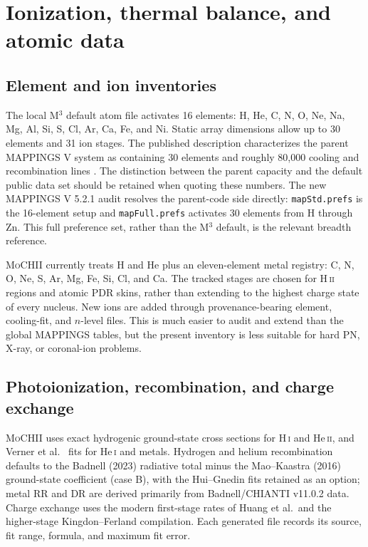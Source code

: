 \documentclass[english,a4paper]{my_memo}
\newcommand{\code}[1]{\texttt{#1}}
\newcommand{\MoCHII}{\textsc{MoCHII}}
\newcommand{\Mthree}{M$^3$}
\newcommand{\Mappings}{MAPPINGS V 5.2.1}
\newcommand{\HI}{H\,\textsc{i}}
\newcommand{\HeI}{He\,\textsc{i}}
\newcommand{\HeII}{He\,\textsc{ii}}
\begin{document}
\section{Ionization, thermal balance, and atomic data}

\subsection{Element and ion inventories}

The local \Mthree{} default atom file activates 16 elements:
H, He, C, N, O, Ne, Na, Mg, Al, Si, S, Cl, Ar, Ca, Fe, and Ni.  Static
array dimensions allow up to 30 elements and 31 ion stages.  The published
description characterizes the parent MAPPINGS V system as containing 30
elements and roughly 80,000 cooling and recombination lines
\cite{jin2022}.  The distinction between the parent capacity and the
default public data set should be retained when quoting these numbers.
The new \Mappings{} audit resolves the parent-code side directly:
\code{mapStd.prefs} is the 16-element setup and \code{mapFull.prefs}
activates 30 elements from H through Zn.  This full preference set, rather
than the \Mthree{} default, is the relevant breadth reference.

\MoCHII{} currently treats H and He plus an eleven-element metal registry:
C, N, O, Ne, S, Ar, Mg, Fe, Si, Cl, and Ca.  The tracked stages are chosen
for H\,\textsc{ii} regions and atomic PDR skins, rather than extending to
the highest charge state of every nucleus.  New ions are added through
provenance-bearing element, cooling-fit, and $n$-level files.  This is much
easier to audit and extend than the global MAPPINGS tables, but the present
inventory is less suitable for hard PN, X-ray, or coronal-ion problems.

\subsection{Photoionization, recombination, and charge exchange}

\MoCHII{} uses exact hydrogenic ground-state cross sections for \HI{} and
\HeII{}, and Verner et al.\ \cite{verner1996} fits for \HeI{} and metals.
Hydrogen and helium recombination defaults to the Badnell (2023) radiative
total minus the Mao--Kaastra (2016) ground-state coefficient (case B), with
the Hui--Gnedin fits retained as an option; metal RR and DR
are derived primarily from Badnell/CHIANTI v11.0.2 data.  Charge exchange
uses the modern first-stage rates of Huang et al.\ and the higher-stage
Kingdon--Ferland compilation.  Each generated file records its source,
fit range, formula, and maximum fit error.
\end{document}
